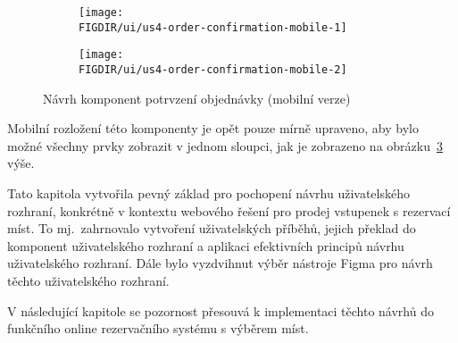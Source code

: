 \begin{figure}[H]
    \centering
    \begin{subfigure}{0.4\textwidth}
        \texttt{[image: \\FIGDIR/ui/us4-order-confirmation-mobile-1]}
        \label{fig:us4-order-confirmation-mobile-1}
    \end{subfigure}
    \hfill
    \begin{subfigure}{0.4\textwidth}
        \texttt{[image: \\FIGDIR/ui/us4-order-confirmation-mobile-2]}
        \label{fig:us4-order-confirmation-mobile-2}
    \end{subfigure}

    \caption{Návrh komponent potrvzení objednávky (mobilní verze)}
    \label{fig:us4-order-confirmation-mobile}
\end{figure}

Mobilní rozložení této komponenty je opět pouze mírně upraveno, aby bylo možné všechny prvky zobrazit v jednom sloupci, jak je zobrazeno na obrázku~\ref{fig:us4-order-confirmation-mobile} výše.

Tato kapitola vytvořila pevný základ pro pochopení návrhu uživatelského rozhraní, konkrétně v kontextu webového řešení pro prodej vstupenek s rezervací míst.
To mj.\ zahrnovalo vytvoření uživatelských příběhů, jejich překlad do komponent uživatelského rozhraní a aplikaci efektivních principů návrhu uživatelského rozhraní.
Dále bylo vyzdvihnut výběr nástroje Figma pro návrh těchto uživatelského rozhraní.

V následující kapitole se pozornost přesouvá k implementaci těchto návrhů do funkčního online rezervačního systému s výběrem míst.
